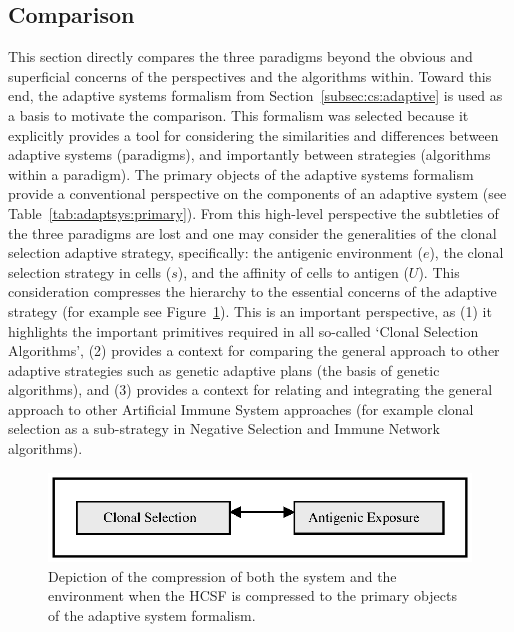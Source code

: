 %
%
\subsection{Comparison}
\label{sec:framework:hcsf:comparison}
This section directly compares the three paradigms beyond the obvious and superficial concerns of the perspectives and the algorithms within. Toward this end, the adaptive systems formalism from Section~\ref{subsec:cs:adaptive} is used as a basis to motivate the comparison. This formalism was selected because it explicitly provides a tool for considering the similarities and differences between adaptive systems (paradigms), and importantly between strategies (algorithms within a paradigm).
The primary objects of the adaptive systems formalism provide a conventional perspective on the components of an adaptive system (see Table~\ref{tab:adaptsys:primary}). From this high-level perspective the subtleties of the three paradigms are lost and one may consider the generalities of the clonal selection adaptive strategy, specifically: the antigenic environment ($e$), the clonal selection strategy in cells ($s$), and the affinity of cells to antigen ($U$). This consideration compresses the hierarchy to the essential concerns of the adaptive strategy (for example see Figure~\ref{fig:framework:hcsf:interpretation:flat-flat}). This is an important perspective, as (1) it highlights the important primitives required in all so-called `Clonal Selection Algorithms', (2) provides a context for comparing the general approach to other adaptive strategies such as genetic adaptive plans (the basis of genetic algorithms), and (3) provides a context for relating and integrating the general approach to other Artificial Immune System approaches (for example clonal selection as a sub-strategy in Negative Selection and Immune Network algorithms).

\begin{figure}[htp]
	\centering
	\includegraphics[scale=0.85]{Framework/framework-integration-flat-flat}
	\caption{Depiction of the compression of both the system and the environment when the HCSF is compressed to the primary objects of the adaptive system formalism.}
	\label{fig:framework:hcsf:interpretation:flat-flat}
\end{figure}

